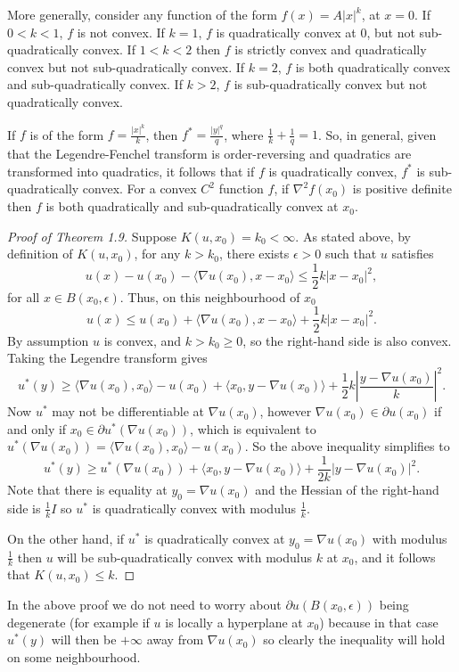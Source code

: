 \documentclass[10pt]{article}
\newenvironment{example}[2][Example]{\begin{trivlist}
\item[\hskip \labelsep {\bfseries #1}\hskip \labelsep {\bfseries #2.}]}{\end{trivlist}}
\begin{document}
\begin{example}{3.6}
More generally, consider any function of the form $f(x)=A|x|^k$, at $x=0$. If $0<k<1$, $f$ is not convex. If $k=1$, $f$ is quadratically convex at 0, but not sub-quadratically convex. If $1<k<2$ then $f$ is strictly convex and quadratically convex but not sub-quadratically convex. If $k=2$, $f$ is both quadratically convex and sub-quadratically convex. If $k>2$, $f$ is sub-quadratically convex but not quadratically convex. 
\end{example}
If $f$ is of the form $f=\frac{|x|^k}{k}$, then $f^*=\frac{|y|^q}{q}$, where $\frac{1}{k}+\frac{1}{q}=1$. So, in general, given that the Legendre-Fenchel transform is order-reversing and quadratics are transformed into quadratics, it follows that if $f$ is quadratically convex, $f^*$ is sub-quadratically convex. For a convex $C^2$ function $f$, if $\nabla^2f(x_0)$ is positive definite then $f$ is both quadratically and sub-quadratically convex at $x_0$.
\begin{proof}[Proof of Theorem 1.9]
Suppose $K(u,x_0)=k_0<\infty$. As stated above, by definition of $K(u,x_0)$, for any $k>k_0$, there exists $\epsilon >0$ such that $u$ satisfies 
$$u(x)-u(x_0)-  \langle \nabla u(x_0), x-x_0 \rangle \leq \frac{1}{2} k|x-x_0|^2,$$ for all $x\in B(x_0,\epsilon)$. Thus, on this neighbourhood of $x_0$
$$u(x) \leq u(x_0)+  \langle \nabla u(x_0), x-x_0 \rangle +\frac{1}{2} k|x-x_0|^2.$$
By assumption $u$ is convex, and $k>k_0\geq 0$, so the right-hand side is also convex. Taking the Legendre transform gives
$$ u^*(y)\geq \langle \nabla u(x_0),x_0 \rangle - u(x_0) +\langle x_0, y- \nabla u(x_0)\rangle+ \frac{1}{2}k\left|\dfrac{y-\nabla u(x_0)}{k}\right|^2.$$
Now $u^*$ may not be differentiable at $\nabla u(x_0)$, however $\nabla u(x_0) \in \partial u(x_0)$ if and only if $x_0\in \partial u^*(\nabla u(x_0))$, which is equivalent to $u^*(\nabla u(x_0))=\langle \nabla u(x_0), x_0 \rangle -u(x_0)$. So the above inequality simplifies to
$$u^*(y)\geq u^*(\nabla u(x_0))+ \langle x_0, y- \nabla u(x_0) \rangle + \frac{1}{2k}|y-\nabla u(x_0)|^2.$$
Note that there is equality at $y_0=\nabla u(x_0)$ and the Hessian of the right-hand side is $\frac{1}{k}I$ so $u^*$ is quadratically convex with modulus $\frac{1}{k}$.

On the other hand, if $u^*$ is quadratically convex at $y_0=\nabla u(x_0)$ with modulus $\frac{1}{k}$ then $u$ will be sub-quadratically convex with modulus $k$ at $x_0$, and it follows that $K(u,x_0)\leq k$.
\end{proof}
In the above proof we do not need to worry about $\partial u(B(x_0,\epsilon))$ being degenerate (for example if $u$ is locally a hyperplane at $x_0$) because in that case $u^*(y)$ will then be $+\infty$ away from $\nabla u(x_0)$ so clearly the inequality will hold on some neighbourhood.
\end{document}
